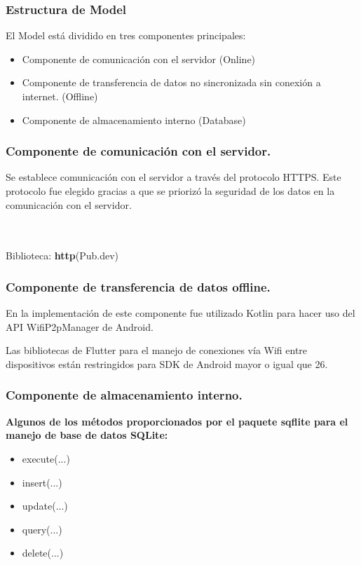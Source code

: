 \documentclass[14pt]{beamer}
\begin{document}
\begin{frame}
\frametitle{Estructura de Model}

El Model está dividido en tres componentes principales:

\begin{itemize}
\item Componente de comunicación con el servidor (Online)

\item Componente de transferencia de datos no sincronizada sin conexión a internet. (Offline)

\item Componente de almacenamiento interno (Database)

\end{itemize}


\end{frame}

\begin{frame}
\frametitle{Componente de comunicación con el servidor.}

\begin{block}{}
Se establece comunicación con el servidor a través del protocolo HTTPS.
Este protocolo fue elegido gracias a que se priorizó la seguridad de los datos en la comunicación con el servidor.
\end{block}

\\
\\
Biblioteca: \textbf{http}(Pub.dev)
\end{frame}

\begin{frame}
\frametitle{Componente de transferencia de datos offline.}

\begin{block}{}
En la implementación de este componente fue utilizado Kotlin para hacer uso del API WifiP2pManager de Android.

Las bibliotecas de Flutter para el manejo de conexiones vía Wifi entre dispositivos están restringidos para SDK de Android mayor o igual que 26.
\end{block}

\end{frame}

\begin{frame}
\frametitle{Componente de almacenamiento interno.}

\textbf{Algunos de los métodos proporcionados por el paquete sqflite para el manejo de base de datos SQLite:}

\begin{itemize}


\item execute(...)
\item insert(...)
\item update(...)
\item query(...)
\item delete(...)
\end{itemize}

\end{frame}
\end{document}
